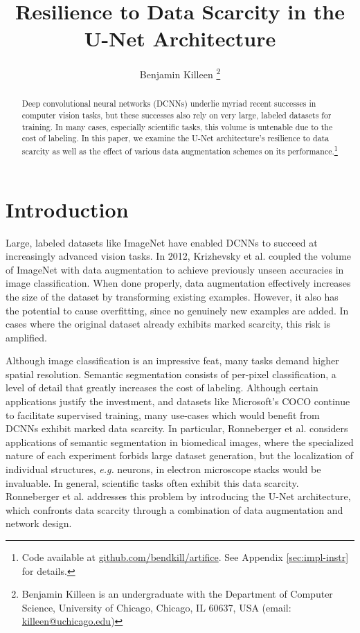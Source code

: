 \documentclass[10pt, journal]{IEEEtran}
\title{Resilience to Data Scarcity in the U-Net Architecture}
\author{Benjamin Killeen %
  \thanks{Benjamin Killeen is an undergraduate with the Department of Computer
    Science, University of Chicago, Chicago, IL 60637, USA (email:
    \href{mailto:killeen@uchicago.edu}{killeen@uchicago.edu})} %
}
\begin{document}
\maketitle

\begin{abstract}
  Deep convolutional neural networks (DCNNs) underlie myriad recent successes in
  computer vision tasks, but these successes also rely on very large, labeled
  datasets for training. In many cases, especially scientific tasks, this volume
  is untenable due to the cost of labeling. In this paper, we examine the U-Net
  architecture's resilience to data scarcity as well as the effect of various
  data augmentation schemes on its performance.\footnote{Code available at
    \href{https://github.com/bendkill/artifice}
    {github.com/bendkill/artifice}. See Appendix \ref{sec:impl-instr} for
    details.}
\end{abstract}

\section{Introduction}
\label{sec:introduction}

Large, labeled datasets like ImageNet \cite{deng_imagenet:_nodate} have enabled
DCNNs to succeed at increasingly advanced vision tasks. In 2012, Krizhevsky et
al. \cite{krizhevsky_imagenet_2012} coupled the volume of ImageNet with data
augmentation to achieve previously unseen accuracies in image
classification. When done properly, data augmentation effectively increases the
size of the dataset by transforming existing examples. However, it also has the
potential to cause overfitting, since no genuinely new examples are added. In
cases where the original dataset already exhibits marked scarcity, this risk is
amplified.

Although image classification is an impressive feat, many tasks demand higher
spatial resolution. Semantic segmentation consists of per-pixel classification,
a level of detail that greatly increases the cost of labeling. Although certain
applications justify the investment, and datasets like Microsoft's COCO
\cite{lin_microsoft_2014} continue to facilitate supervised training, many
use-cases which would benefit from DCNNs exhibit marked data scarcity. In
particular, Ronneberger et al. \cite{ronneberger_u-net:_2015} considers
applications of semantic segmentation in biomedical images, where the
specialized nature of each experiment forbids large dataset generation, but the
localization of individual structures, \textit{e.g.} neurons, in electron
microscope stacks would be invaluable. In general, scientific tasks often
exhibit this data scarcity. Ronneberger et al. addresses this problem by
introducing the U-Net architecture, which confronts data scarcity through a
combination of data augmentation and network design.
\end{document}
